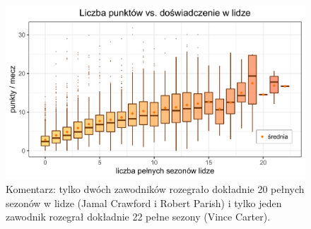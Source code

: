 \documentclass[12pt,a4paper]{article}\usepackage[]{graphicx}\usepackage[]{color}
\makeatletter
\def\maxwidth{ %
  \ifdim\Gin@nat@width>\linewidth
    \linewidth
  \else
    \Gin@nat@width
  \fi
}
\newenvironment{knitrout}{}{} %
\makeatother
\begin{document}
\begin{knitrout}
\color{fgcolor}\begin{figure}

{\centering \includegraphics[width=\maxwidth]{figure/unnamed-chunk-3-1} 

}

\caption[Komentarz]{Komentarz: tylko dwóch zawodników rozegrało dokładnie 20 pełnych sezonów w lidze (Jamal Crawford i Robert Parish) i tylko jeden zawodnik rozegrał dokładnie 22 pełne sezony (Vince Carter).}\label{fig:unnamed-chunk-3}
\end{figure}

\end{knitrout}
\end{document}
